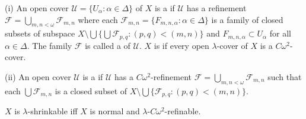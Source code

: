 \documentclass[jisng5i.tex]{subfiles}
\begin{document}
{ \label{def:5.2.3}
\textup{(i)}  An open cover \(\mathscr{U} = \{ U_\alpha: \alpha \in \Delta \}\) of $X$ is a 
if \(\mathscr{U}\) has a refinement \(\mathscr{F} = \bigcup_{m,n<\omega} \mathscr{F}_{m,n}\) 
where each \(\mathscr{F}_{m,n} = \{ F_{m,n,\alpha}: \alpha \in \Delta \}\) is a family of 
closed subsets of subspace  \(X\setminus \bigcup \{\bigcup \mathscr{F}_{p, q}: (p, q) < (m,n) \}\)
and $F_{m, n, \alpha} \subset U_\alpha$ for all \(\alpha \in \Delta\).
The family \(\mathscr{F}\) is called a 
of \(\mathscr{U}\).
\(X\) is 
if every open \(\lambda\)-cover of \(X\) is a $C\omega^2$-cover.

\textup{(ii)}  An open cover \(\mathscr{U}\) is a 
 if \(\mathscr{U}\) has a $C\omega^2$-refinement 
 \(\mathscr{F} = \bigcup_{m,n<\omega} \mathscr{F}_{m,n}\) 
 such that each \(\bigcup \mathscr{F}_{m,n} \) is a closed subset of 
 $X\setminus \bigcup\{\mathscr{F}_{p, q}: (p, q) < (m, n)\}$.
}

{\theorem{} \label{th:5.2.4}
\(X\) is $\lambda$-shrinkable iff \(X\) is normal and $\lambda$-$C\omega^2$-refinable.
}
\end{document}
